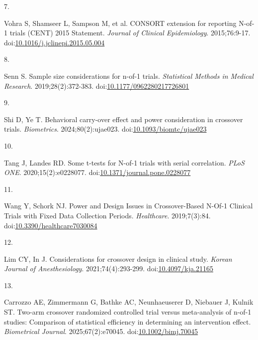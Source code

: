 \documentclass[
  11pt,
]{article}
\newlength{\cslhangindent}
\newlength{\csllabelwidth}
\newenvironment{CSLReferences}[2] %
 {\begin{list}{}{%
  \setlength{\itemindent}{0pt}
  \setlength{\leftmargin}{0pt}
  \setlength{\parsep}{0pt}
  \ifodd #1
   \setlength{\leftmargin}{\cslhangindent}
   \setlength{\itemindent}{-1\cslhangindent}
  \fi
  \setlength{\itemsep}{#2\baselineskip}}}
 {\end{list}}
\newcommand{\CSLLeftMargin}[1]{\parbox[t]{\csllabelwidth}{\strut#1\strut}}
\newcommand{\CSLRightInline}[1]{\parbox[t]{\linewidth - \csllabelwidth}{\strut#1\strut}}
\begin{document}
\begin{CSLReferences}{0}{1}
\CSLLeftMargin{7. }%
\CSLRightInline{{Vohra S, Shamseer L, Sampson M, et al.} {CONSORT} extension for reporting {N-of-1} trials ({CENT}) 2015 {Statement}. \emph{Journal of Clinical Epidemiology}. 2015;76:9-17. doi:\href{https://doi.org/10.1016/j.jclinepi.2015.05.004}{10.1016/j.jclinepi.2015.05.004}}

\CSLLeftMargin{8. }%
\CSLRightInline{Senn S. Sample size considerations for n-of-1 trials. \emph{Statistical Methods in Medical Research}. 2019;28(2):372-383. doi:\href{https://doi.org/10.1177/0962280217726801}{10.1177/0962280217726801}}

\CSLLeftMargin{9. }%
\CSLRightInline{Shi D, Ye T. Behavioral carry-over effect and power consideration in crossover trials. \emph{Biometrics}. 2024;80(2):ujae023. doi:\href{https://doi.org/10.1093/biomtc/ujae023}{10.1093/biomtc/ujae023}}

\CSLLeftMargin{10. }%
\CSLRightInline{Tang J, Landes RD. Some t-tests for {N}-of-1 trials with serial correlation. \emph{PLoS ONE}. 2020;15(2):e0228077. doi:\href{https://doi.org/10.1371/journal.pone.0228077}{10.1371/journal.pone.0228077}}

\CSLLeftMargin{11. }%
\CSLRightInline{Wang Y, Schork NJ. Power and {Design Issues} in {Crossover-Based N-Of-1 Clinical Trials} with {Fixed Data Collection Periods}. \emph{Healthcare}. 2019;7(3):84. doi:\href{https://doi.org/10.3390/healthcare7030084}{10.3390/healthcare7030084}}

\CSLLeftMargin{12. }%
\CSLRightInline{Lim CY, In J. Considerations for crossover design in clinical study. \emph{Korean Journal of Anesthesiology}. 2021;74(4):293-299. doi:\href{https://doi.org/10.4097/kja.21165}{10.4097/kja.21165}}

\CSLLeftMargin{13. }%
\CSLRightInline{Carrozzo AE, Zimmermann G, Bathke AC, Neunhaeuserer D, Niebauer J, Kulnik ST. Two-arm crossover randomized controlled trial versus meta-analysis of n-of-1 studies: Comparison of statistical efficiency in determining an intervention effect. \emph{Biometrical Journal}. 2025;67(2):e70045. doi:\href{https://doi.org/10.1002/bimj.70045}{10.1002/bimj.70045}}


\end{CSLReferences}
\end{document}
